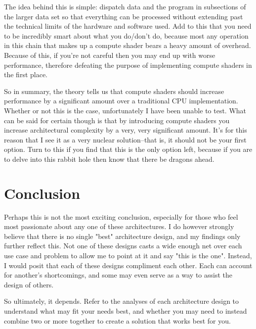 \documentclass{article}
\begin{document}
The idea behind this is simple: dispatch data and the program in subsections of
the larger data set so that everything can be processed without extending past
the technical limits of the hardware and software used. Add to this that you
need to be incredibly smart about what you do/don't do, because most any
operation in this chain that makes up a compute shader bears a heavy amount of
overhead. Because of this, if you're not careful then you may end up with worse
performance, therefore defeating the purpose of implementing compute shaders in
the first place.

So in summary, the theory tells us that compute shaders should increase
performance by a significant amount over a traditional CPU implementation.
Whether or not this is the case, unfortunately I have been unable to test. What
can be said for certain though is that by introducing compute shaders you
increase architectural complexity by a very, very significant amount. It's for
this reason that I see it as a very nuclear solution--that is, it should not be
your first option. Turn to this if you find that this is the only option left,
because if you are to delve into this rabbit hole then know that there be
dragons ahead.

\section{Conclusion}
Perhaps this is not the most exciting conclusion, especially for those who feel
most passionate about any one of these architectures. I do however strongly
believe that there is no single "best" architecture design, and my findings
only further reflect this. Not one of these designs casts a wide enough net
over each use case and problem to allow me to point at it and say "this is the
one". Instead, I would posit that each of these designs compliment each other.
Each can account for another's shortcomings, and some may even serve as a way to
assist the design of others. 

So ultimately, it depends. Refer to the analyses of each architecture design to
understand what may fit your needs best, and whether you may need to instead
combine two or more together to create a solution that works best for you.
\end{document}
